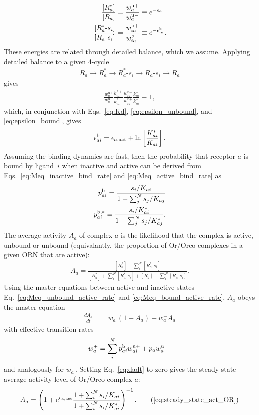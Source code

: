 \documentclass[9pt,twocolumn,twoside,lineno]{pnas-new}
\begin{document}
\begin{align}
\frac{[R^*_a]}{[R_a]} &= \frac{w^{\text{u}+}_a}{w^{\text{u}-}_a} \equiv e^{-\epsilon_a} \label{eq:epsilon_unbound} \\
\frac{[R^*_a\text{-}s_i]}{[R_a\text{-}s_i]} &= \frac{w^{\text{b}+}_{ia}}{w^{\text{b}-}_{ia}} \equiv e^{-\epsilon^{\text b}_{ia}}.\label{eq:epsilon_bound}
\end{align}
These energies are related through detailed balance, which we assume. Applying detailed balance to a given 4-cycle 
\begin{align}
R_a \rightarrow R_a^* \rightarrow R_a^*\text{-}s_i \rightarrow R_a\text{-}s_i \rightarrow R_a
\end{align}
gives
\begin{align}
\frac{w^{\text{u}+}_a}{w^{\text{u}-}_a}\frac{k^{*+}_{ia}}{k^{*-}_{ia}}\frac{w^{\text{b}-}_{ia}}{w^{\text{b}+}_{ia}}\frac{k^{-}_{ia}}{k^{+}_{ia}} \equiv 1,
\label{eq:detailed_balance}
\end{align}
which, in conjunction with Eqs.~\ref{eq:Kd}, \ref{eq:epsilon_unbound}, and \ref{eq:epsilon_bound}, gives
\begin{align}
\epsilon_{ai}^{\text b} = \epsilon_{a, \textup{act}} + \ln\left[\frac{K^*_{ai}}{K_{ai}}\right].
\label{testing_equation}
\end{align}
Assuming the binding dynamics are fast, then the probability that receptor $a$ is bound by ligand~$i$ when inactive and active can be derived from  Eqs.~\ref{eq:Meq_inactive_bind_rate} and \ref{eq:Meq_active_bind_rate} as
\begin{align}
p^{\text b}_{ai} = \frac{s_i/K_{ai}}{1 + \sum_j^Ns_j/K_{aj}} \label{eq:bound_prob_ai_inactive} \\
p^{\text b, *}_{ai} = \frac{s_i/K^*_{ai}}{1 + \sum_j^Ns_j/K^*_{aj}} \label{eq:bound_prob_ai_active}.
\end{align}
The average  activity $A_a$ of complex $a$ is the likelihood that the complex is active, unbound or unbound (equivalantly, the proportion of Or/Orco complexes in a given ORN that are active):
\begin{align}
A_a = \frac{[R^*_a] + \sum_i^N[R^*_a\text{-}s_i]}{[R^*_a] + \sum_i^N[R^*_a\text{-}s_i] + {[R_a] + \sum_i^N[R_a\text{-}s_i]}}.
\end{align} 
Using the master equations between active and inactive states Eq.~\ref{eq:Meq_unbound_active_rate} and \ref{eq:Meq_bound_active_rate}, $A_a$  obeys the master equation
\begin{align}
\frac{dA_a}{dt} &= w^+_a(1 - A_a) + w^-_aA_a
\label{eq:dadt}
\end{align}
with effective transition rates
\begin{align}
w^+_a &= \sum_i^Np^{\text b}_{ai} w^{\text u +}_{ai} + p_{a}w^{\text u}_a 
\end{align}
and analogously for $w_a^-$. Setting Eq.~\ref{eq:dadt} to zero gives the steady state average activity level of Or/Orco complex $a$:
\begin{align}
A_a = \left(1 + e^{\epsilon_{a, \textup{act}}}\frac{1 + \sum_i^N s_i/K_{ai}}{1 + \sum_i^N s_i/K^*_{ai}}\right)^{-1}. \tag{\ref{eq:steady_state_act_OR}}
\end{align}
	
\end{document}
